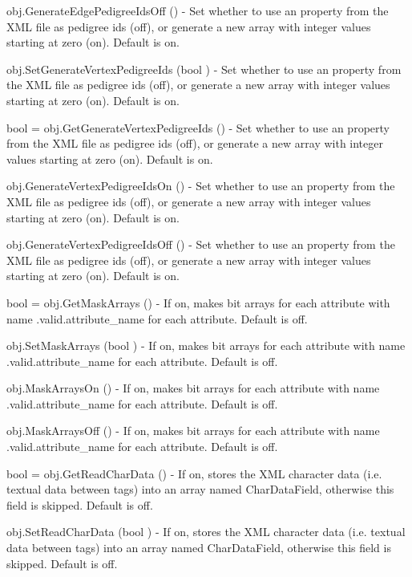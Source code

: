 \begin{DoxyItemize}
\item {\ttfamily obj.\-Generate\-Edge\-Pedigree\-Ids\-Off ()} -\/ Set whether to use an property from the X\-M\-L file as pedigree ids (off), or generate a new array with integer values starting at zero (on). Default is on.  
\item {\ttfamily obj.\-Set\-Generate\-Vertex\-Pedigree\-Ids (bool )} -\/ Set whether to use an property from the X\-M\-L file as pedigree ids (off), or generate a new array with integer values starting at zero (on). Default is on.  
\item {\ttfamily bool = obj.\-Get\-Generate\-Vertex\-Pedigree\-Ids ()} -\/ Set whether to use an property from the X\-M\-L file as pedigree ids (off), or generate a new array with integer values starting at zero (on). Default is on.  
\item {\ttfamily obj.\-Generate\-Vertex\-Pedigree\-Ids\-On ()} -\/ Set whether to use an property from the X\-M\-L file as pedigree ids (off), or generate a new array with integer values starting at zero (on). Default is on.  
\item {\ttfamily obj.\-Generate\-Vertex\-Pedigree\-Ids\-Off ()} -\/ Set whether to use an property from the X\-M\-L file as pedigree ids (off), or generate a new array with integer values starting at zero (on). Default is on.  
\item {\ttfamily bool = obj.\-Get\-Mask\-Arrays ()} -\/ If on, makes bit arrays for each attribute with name .valid.\-attribute\-\_\-name for each attribute. Default is off.  
\item {\ttfamily obj.\-Set\-Mask\-Arrays (bool )} -\/ If on, makes bit arrays for each attribute with name .valid.\-attribute\-\_\-name for each attribute. Default is off.  
\item {\ttfamily obj.\-Mask\-Arrays\-On ()} -\/ If on, makes bit arrays for each attribute with name .valid.\-attribute\-\_\-name for each attribute. Default is off.  
\item {\ttfamily obj.\-Mask\-Arrays\-Off ()} -\/ If on, makes bit arrays for each attribute with name .valid.\-attribute\-\_\-name for each attribute. Default is off.  
\item {\ttfamily bool = obj.\-Get\-Read\-Char\-Data ()} -\/ If on, stores the X\-M\-L character data (i.\-e. textual data between tags) into an array named Char\-Data\-Field, otherwise this field is skipped. Default is off.  
\item {\ttfamily obj.\-Set\-Read\-Char\-Data (bool )} -\/ If on, stores the X\-M\-L character data (i.\-e. textual data between tags) into an array named Char\-Data\-Field, otherwise this field is skipped. Default is off.  

\end{DoxyItemize}
